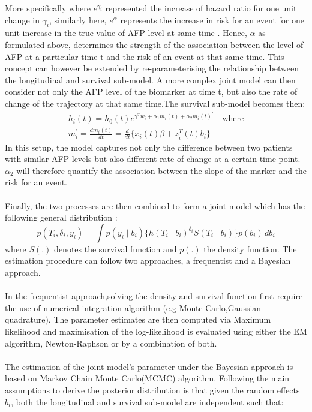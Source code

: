 \documentclass[11pt,twoside]{article}
\numberwithin{Theorem}{section}
\numberwithin{Definition}{section}
\numberwithin{Lemma}{section}
\numberwithin{Algorithm}{section}
\numberwithin{equation}{section}
\begin{document}
More specifically where $e^{\gamma_i}$ represented the increase of hazard ratio for one unit change in $\gamma_i$, similarly here, $e^{\alpha}$ represents the increase in risk for an event for one unit increase in the true value of AFP level at same time \cite{Rizopoulos2010}. Hence, $\alpha$ as formulated above, determines the strength of the association between the level of AFP at a particular time t and the risk of an event at that same time. This concept can however be extended by re-parameterising the relationship between the longitudinal and survival sub-model. A more complex joint model can then consider not only the AFP level of the biomarker at time t, but also the rate of change of the trajectory at that same time.The survival sub-model becomes then:
\begin{align}
    h_i(t)=h_0(t) e^{\gamma^Tw_i+ \alpha_1m_i(t)+\alpha_2m_i(t)^{'}} \quad
    \text{where}\\
    m_i^{'}=\frac{dm_i(t)}{dt}=\frac{d}{dt}\{x_i(t)\beta+z_i^T(t)b_i\}
\end{align}
In this setup, the model captures not only the difference between two patients with similar AFP levels but also different rate of change at a certain time point. $\alpha_2$ will therefore quantify the association between the slope of the marker and the risk for an event.
\\
\\
%
Finally, the two processes are then combined to form a joint model which has the following general distribution \cite{tsiatis2004joint}:
$$p(T_i,\delta_i,y_i) = \int p(y_i \mid b_i)\{h(T_i \mid b_i)^{\delta_i}
S(T_i\mid b_i)\} p(b_i)\, db_i$$
%
where $S(.)$ denotes the survival function and $p(.)$ the density function.
The estimation procedure can follow two approaches, a frequentist and a Bayesian approach.\\ \\ In the frequentist approach,solving the density and survival function first require the use of numerical integration algorithm (e.g Monte Carlo,Gaussian quadrature). The parameter estimates are then computed via Maximum likelihood and maximisation of the log-likelihood  is evaluated using either the EM algorithm, Newton-Raphson or by a combination of both.
\\ \\
 The estimation of the joint model's parameter under the Bayesian approach is based on Markov Chain Monte Carlo(MCMC) algorithm. Following \cite{sweeting2017using} the main assumptions to derive the posterior distribution is that given the random effects $b_i$, both the longitudinal and survival sub-model are independent such that:
\end{document}
